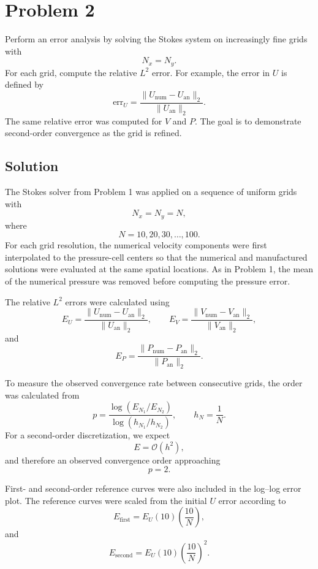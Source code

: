 \documentclass[12pt]{article}
\begin{document}

\section*{Problem 2}

Perform an error analysis by solving the Stokes system on increasingly fine
grids with
\[
N_x=N_y.
\]
For each grid, compute the relative $L^2$ error. For example, the error in
$U$ is defined by
\[
\mathrm{err}_U
=
\frac{
\|U_{\mathrm{num}}-U_{\mathrm{an}}\|_2
}{
\|U_{\mathrm{an}}\|_2
}.
\]
The same relative error was computed for $V$ and $P$. The goal is to
demonstrate second-order convergence as the grid is refined.

\subsection*{Solution}

The Stokes solver from Problem 1 was applied on a sequence of uniform grids
with
\[
N_x=N_y=N,
\]
where
\[
N=10,20,30,\ldots,100.
\]
For each grid resolution, the numerical velocity components were first
interpolated to the pressure-cell centers so that the numerical and
manufactured solutions were evaluated at the same spatial locations. As in
Problem 1, the mean of the numerical pressure was removed before computing
the pressure error.

The relative $L^2$ errors were calculated using
\[
E_U
=
\frac{
\|U_{\mathrm{num}}-U_{\mathrm{an}}\|_2
}{
\|U_{\mathrm{an}}\|_2
},
\qquad
E_V
=
\frac{
\|V_{\mathrm{num}}-V_{\mathrm{an}}\|_2
}{
\|V_{\mathrm{an}}\|_2
},
\]
and
\[
E_P
=
\frac{
\|P_{\mathrm{num}}-P_{\mathrm{an}}\|_2
}{
\|P_{\mathrm{an}}\|_2
}.
\]

To measure the observed convergence rate between consecutive grids, the
order was calculated from
\[
p
=
\frac{
\log(E_{N_1}/E_{N_2})
}{
\log(h_{N_1}/h_{N_2})
},
\qquad
h_N=\frac{1}{N}.
\]
For a second-order discretization, we expect
\[
E=\mathcal{O}(h^2),
\]
and therefore an observed convergence order approaching
\[
p=2.
\]

First- and second-order reference curves were also included in the
log--log error plot. The reference curves were scaled from the initial
$U$ error according to
\[
E_{\mathrm{first}}
=
E_U(10)
\left(\frac{10}{N}\right),
\]
and
\[
E_{\mathrm{second}}
=
E_U(10)
\left(\frac{10}{N}\right)^2.
\]
\end{document}
